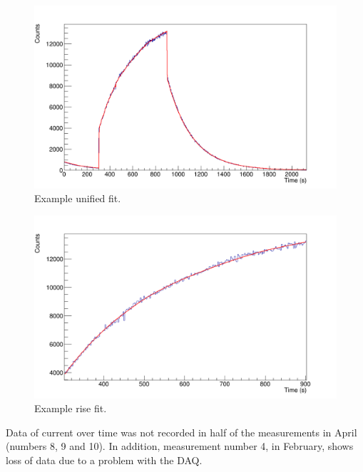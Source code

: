 \documentclass[a4paper,12pt]{report}
\begin{document}
\begin{figure}[H]
	\centering
	\includegraphics[width=\textwidth]{example_unified_fit.png}
	\caption{Example unified fit.}
	\label{example_unified_fit}
\end{figure}

\begin{figure}[H]
	\centering
	\includegraphics[width=\textwidth]{example_rise_fit.png}
	\caption{Example rise fit.}
	\label{example_rise_fit}
\end{figure}

Data of current over time was not recorded in half of the measurements in April (numbers 8, 9 and 10).	%
In addition, measurement number 4, in February, shows loss of data due to a problem with the DAQ.
\end{document}
